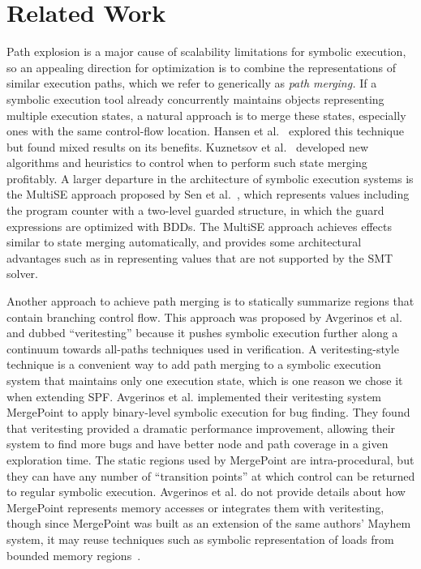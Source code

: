 \section{Related Work}

Path explosion is a major cause of scalability limitations for
symbolic execution, so an appealing direction for optimization is to
combine the representations of similar execution paths, which we refer
to generically as {\em path merging.}
%
If a symbolic execution tool already concurrently maintains objects
representing multiple execution states, a natural approach is to merge
these states, especially ones with the same control-flow location.
%
Hansen et al.~\cite{HansenSS2009} explored this technique but found
mixed results on its benefits.
%
Kuznetsov et al.~\cite{kuznetsov} developed new algorithms and
heuristics to control when to perform such state merging profitably.
%
A larger departure in the architecture of symbolic execution systems
is the MultiSE approach proposed by Sen et al.~\cite{multise}, which
represents values including the program counter with a two-level
guarded structure, in which the guard expressions are optimized with
BDDs.
%
The MultiSE approach achieves effects similar to state merging
automatically, and provides some architectural advantages such as in
representing values that are not supported by the SMT solver.

Another approach to achieve path merging is to statically summarize
regions that contain branching control flow.
%
This approach was proposed by Avgerinos et al.~\cite{veritesting} and
dubbed ``veritesting'' because it pushes symbolic execution further
along a continuum towards all-paths techniques used in verification.
%
A veritesting-style technique is a convenient way to add path merging
to a symbolic execution system that maintains only one execution
state, which is one reason we chose it when extending SPF.
%
Avgerinos et al. implemented their veritesting system
MergePoint to apply binary-level symbolic execution for
bug finding.
%
They found that veritesting provided a dramatic performance
improvement, allowing their system to find more bugs and have better
node and path coverage in a given exploration time.
%
The static regions used by MergePoint are intra-procedural, but they
can have any number of ``transition points'' at which control can be
returned to regular symbolic execution.
%
Avgerinos et al. do not provide details about how MergePoint
represents memory accesses or integrates them with veritesting, though
since MergePoint was built as an extension of the same authors' Mayhem
system, it may reuse techniques such as symbolic representation of
loads from bounded memory regions~\cite{mayhem}.

